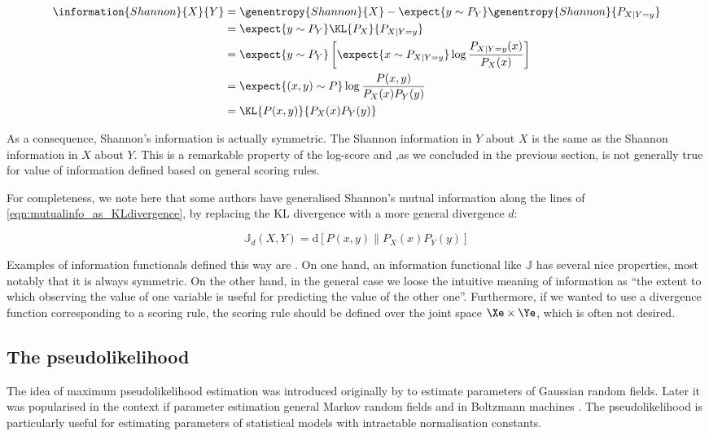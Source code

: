 \begin{align}
	\information{Shannon}{X}{Y} &= \genentropy{Shannon}{X} - \expect{y \sim P_{Y}} \genentropy{Shannon}{P_{X\vert Y=y}}\\
		&= \expect{y \sim P_{Y}}\KL{P_X}{P_{X\vert Y=y}}\\
		&= \expect{y \sim P_{Y}}\left[\expect{x \sim P_{X\vert Y=y}} \log\frac{P_{X\vert Y=y}(x)}{P_X(x)} \right]\\
		&= \expect{(x,y) \sim P} \log \frac{P(x,y)}{P_{X}(x)P_{Y}(y)}\\
		&= \KL{P(x,y)}{P_{X}(x)P_{Y}(y)}\label{eqn:mutualinfo_as_KLdivergence}
\end{align}

As a consequence, Shannon's information is actually symmetric. The Shannon information in $Y$ about $X$ is the same as the Shannon information in $X$ about $Y$. This is a remarkable property of the log-score and ,as we concluded in the previous section, is not generally true for value of information defined based on general scoring rules.

For completeness, we note here that some authors have generalised Shannon's mutual information along the lines of \eqref{eqn:mutualinfo_as_KLdivergence}, by replacing the KL divergence with a more general divergence $d$:

\begin{equation}
	\mathbb{J}_{d}(X,Y) = \mbox{d}\left[ P(x,y) \middle\| P_{X}(x)P_{Y}(y) \right]\label{mutualinfo_generalisations}
\end{equation}

Examples of information functionals defined this way are \citep{Poczos2011}.
On one hand, an information functional like $\mathbb{J}$ has several nice properties, most notably that it is always symmetric. On the other hand, in the general case we loose the intuitive meaning of information as ``the extent to which observing the value of one variable is useful for predicting the value of the other one''. Furthermore, if we wanted to use a divergence function corresponding to a scoring rule, the scoring rule should be defined over the joint space $\Xe\times\Ye$, which is often not desired.

\subsection{The pseudolikelihood}

The idea of maximum pseudolikelihood estimation was introduced originally by \citep{Besag1977} to estimate parameters of Gaussian random fields. Later it was popularised in the context if parameter estimation general Markov random fields \citep{Comets1992} and in Boltzmann machines \citep{Hyvarinen2006}. The pseudolikelihood is particularly useful for estimating parameters of statistical models with intractable normalisation constants.

